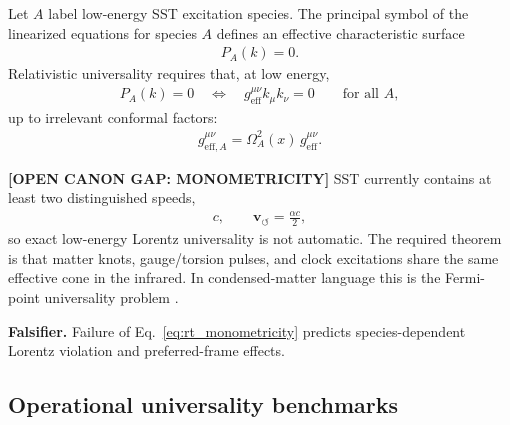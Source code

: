 Let \(A\) label low-energy SST excitation species. The principal symbol of the
linearized equations for species \(A\) defines an effective characteristic
surface
\begin{align}
    P_A(k)=0 .
\end{align}
Relativistic universality requires that, at low energy,
\begin{align}
    P_A(k)=0
    \quad\Longleftrightarrow\quad
    g_{\mathrm{eff}}^{\mu\nu} k_\mu k_\nu=0
    \qquad
    \text{for all } A ,
    \label{eq:rt_monometricity}
\end{align}
up to irrelevant conformal factors:
\begin{align}
    g^{\mu\nu}_{\mathrm{eff},A}
    =
    \Omega_A^2(x)\,
    g^{\mu\nu}_{\mathrm{eff}} .
\end{align}

\textbf{[OPEN CANON GAP: MONOMETRICITY]} SST currently contains at least two
distinguished speeds,
\begin{align}
    c,
    \qquad
    \mathbf{v}_{\!\boldsymbol{\circlearrowleft}}
    =
    \frac{\alpha c}{2},
\end{align}
so exact low-energy Lorentz universality is not automatic. The required theorem
is that matter knots, gauge/torsion pulses, and clock excitations share the
same effective cone in the infrared. In condensed-matter language this is the
Fermi-point universality problem \cite{Volovik2003}.

\textbf{Falsifier.} Failure of Eq.~\eqref{eq:rt_monometricity} predicts
species-dependent Lorentz violation and preferred-frame effects.

\subsection{Operational universality benchmarks}

